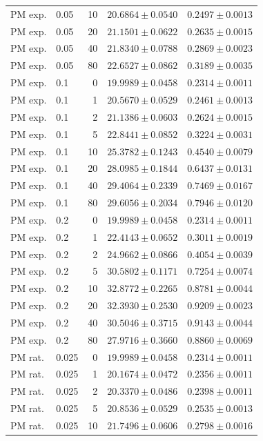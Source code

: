 \begin{longtable}{llrll}
PM exp. & 0.05 & 10 & $20.6864 \pm 0.0540$ & $0.2497 \pm 0.0013$ \\
PM exp. & 0.05 & 20 & $21.1501 \pm 0.0622$ & $0.2635 \pm 0.0015$ \\
PM exp. & 0.05 & 40 & $21.8340 \pm 0.0788$ & $0.2869 \pm 0.0023$ \\
PM exp. & 0.05 & 80 & $22.6527 \pm 0.0862$ & $0.3189 \pm 0.0035$ \\
PM exp. & 0.1 & 0 & $19.9989 \pm 0.0458$ & $0.2314 \pm 0.0011$ \\
PM exp. & 0.1 & 1 & $20.5670 \pm 0.0529$ & $0.2461 \pm 0.0013$ \\
PM exp. & 0.1 & 2 & $21.1386 \pm 0.0603$ & $0.2624 \pm 0.0015$ \\
PM exp. & 0.1 & 5 & $22.8441 \pm 0.0852$ & $0.3224 \pm 0.0031$ \\
PM exp. & 0.1 & 10 & $25.3782 \pm 0.1243$ & $0.4540 \pm 0.0079$ \\
PM exp. & 0.1 & 20 & $28.0985 \pm 0.1844$ & $0.6437 \pm 0.0131$ \\
PM exp. & 0.1 & 40 & $29.4064 \pm 0.2339$ & $0.7469 \pm 0.0167$ \\
PM exp. & 0.1 & 80 & $29.6056 \pm 0.2034$ & $0.7946 \pm 0.0120$ \\
PM exp. & 0.2 & 0 & $19.9989 \pm 0.0458$ & $0.2314 \pm 0.0011$ \\
PM exp. & 0.2 & 1 & $22.4143 \pm 0.0652$ & $0.3011 \pm 0.0019$ \\
PM exp. & 0.2 & 2 & $24.9662 \pm 0.0866$ & $0.4054 \pm 0.0039$ \\
PM exp. & 0.2 & 5 & $30.5802 \pm 0.1171$ & $0.7254 \pm 0.0074$ \\
PM exp. & 0.2 & 10 & $32.8772 \pm 0.2265$ & $0.8781 \pm 0.0044$ \\
PM exp. & 0.2 & 20 & $32.3930 \pm 0.2530$ & $0.9209 \pm 0.0023$ \\
PM exp. & 0.2 & 40 & $30.5046 \pm 0.3715$ & $0.9143 \pm 0.0044$ \\
PM exp. & 0.2 & 80 & $27.9716 \pm 0.3660$ & $0.8860 \pm 0.0069$ \\
PM rat. & 0.025 & 0 & $19.9989 \pm 0.0458$ & $0.2314 \pm 0.0011$ \\
PM rat. & 0.025 & 1 & $20.1674 \pm 0.0472$ & $0.2356 \pm 0.0011$ \\
PM rat. & 0.025 & 2 & $20.3370 \pm 0.0486$ & $0.2398 \pm 0.0011$ \\
PM rat. & 0.025 & 5 & $20.8536 \pm 0.0529$ & $0.2535 \pm 0.0013$ \\
PM rat. & 0.025 & 10 & $21.7496 \pm 0.0606$ & $0.2798 \pm 0.0016$ \\

\end{longtable}
